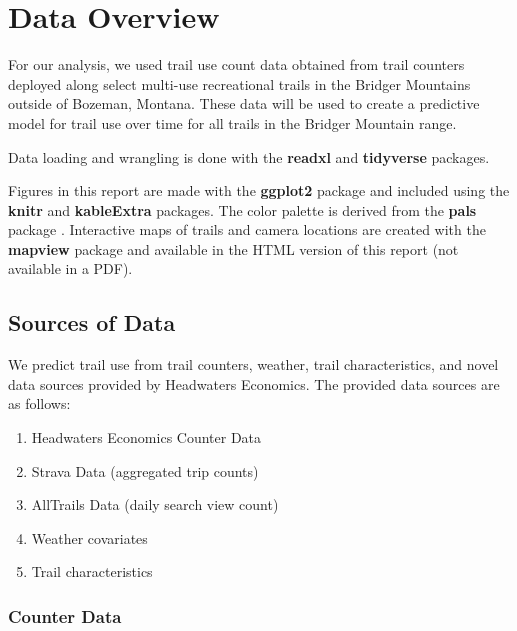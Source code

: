 \documentclass[
]{book}
\providecommand{\tightlist}{%
  \setlength{\itemsep}{0pt}\setlength{\parskip}{0pt}}
\begin{document}
\hypertarget{Data}{%
\chapter{Data Overview}\label{Data}}

For our analysis, we used trail use count data obtained from trail
counters deployed along select multi-use recreational trails in the
Bridger Mountains outside of Bozeman, Montana. These data will be used
to create a predictive model for trail use over time for all trails in
the Bridger Mountain range.

Data loading and wrangling is done with the \textbf{readxl} \citep{R-readxl} and
\textbf{tidyverse} \citep{R-tidyverse} packages.

Figures in this report are made with the \textbf{ggplot2} package
\citep{R-ggplot2} and included using the \textbf{knitr} \citep{R-knitr} and
\textbf{kableExtra} \citep{R-kableExtra} packages. The color palette is derived
from the \textbf{pals} package \citep{R-pals}. Interactive maps of trails and
camera locations are created with the \textbf{mapview} package \citep{R-mapview}
and available in the HTML version of this report (not available in a
PDF).

\hypertarget{sources-of-data}{%
\section{Sources of Data}\label{sources-of-data}}

We predict trail use from trail counters, weather, trail
characteristics, and novel data sources provided by Headwaters
Economics. The provided data sources are as follows:

\begin{enumerate}
\def\labelenumi{\arabic{enumi}.}
\tightlist
\item
  Headwaters Economics Counter Data
\item
  Strava Data (aggregated trip counts)
\item
  AllTrails Data (daily search view count)
\item
  Weather covariates
\item
  Trail characteristics
\end{enumerate}

\hypertarget{counter-data}{%
\subsection{Counter Data}\label{counter-data}}
\end{document}
